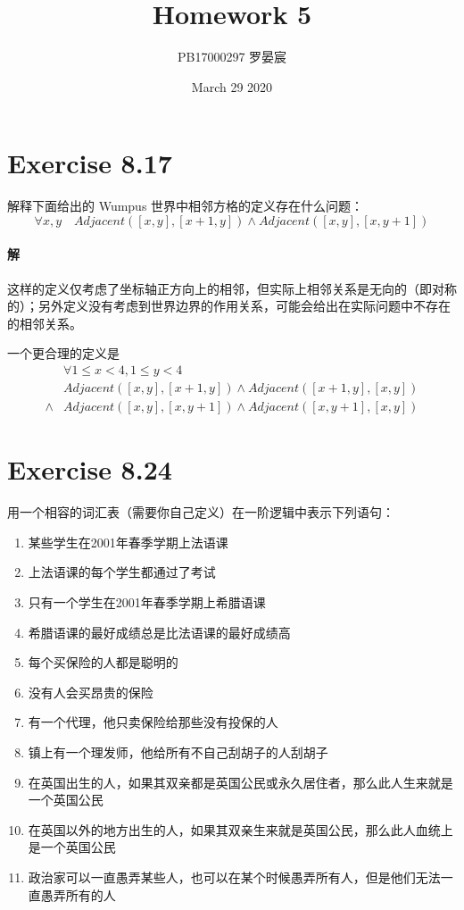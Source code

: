\documentclass{article}
\title{Homework 5}
\author{PB17000297 罗晏宸}
\date{March 29 2020}
\begin{document}
\maketitle

\section{Exercise 8.17}
解释下面给出的 Wumpus 世界中相邻方格的定义存在什么问题：
$$
    \forall x, y \quad \textit{Adjacent}([x, y], [x + 1, y]) \land \textit{Adjacent}([x, y], [x, y + 1])
$$

\paragraph{解}
这样的定义仅考虑了坐标轴正方向上的相邻，但实际上相邻关系是无向的（即对称的）；另外定义没有考虑到世界边界的作用关系，可能会给出在实际问题中不存在的相邻关系。

一个更合理的定义是
\begin{equation*}
    \begin{aligned}
         & \forall 1 \leqslant x < 4, 1 \leqslant y < 4 \\ & \textit{Adjacent}([x, y], [x + 1, y]) \land \textit{Adjacent}([x + 1, y], [x, y]) \\ \land &\textit{Adjacent}([x, y], [x, y + 1]) \land \textit{Adjacent}([x, y + 1], [x, y])
    \end{aligned}
\end{equation*}

\section{Exercise 8.24}
用一个相容的词汇表（需要你自己定义）在一阶逻辑中表示下列语句：
\begin{enumerate}[label = \emph{\alph*}.]
    \item 某些学生在2001年春季学期上法语课
    \item 上法语课的每个学生都通过了考试
    \item 只有一个学生在2001年春季学期上希腊语课
    \item 希腊语课的最好成绩总是比法语课的最好成绩高
    \item 每个买保险的人都是聪明的
    \item 没有人会买昂贵的保险
    \item 有一个代理，他只卖保险给那些没有投保的人
    \item 镇上有一个理发师，他给所有不自己刮胡子的人刮胡子
    \item 在英国出生的人，如果其双亲都是英国公民或永久居住者，那么此人生来就是一个英国公民
    \item 在英国以外的地方出生的人，如果其双亲生来就是英国公民，那么此人血统上是一个英国公民
    \item 政治家可以一直愚弄某些人，也可以在某个时候愚弄所有人，但是他们无法一直愚弄所有的人
\end{enumerate}
\end{document}
